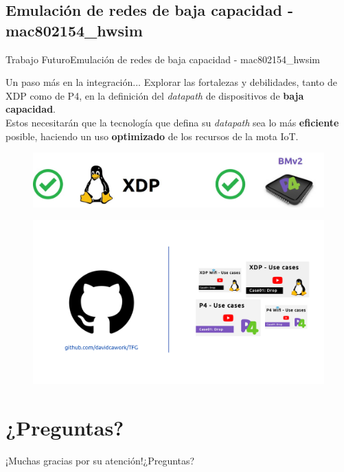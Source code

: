 \documentclass[10pt,compress,xcolor=table]{beamer} %
\begin{document}
\subsection{Emulación de redes de baja capacidad - mac802154\_hwsim}
\begin{frame}{Trabajo Futuro}{Emulación de redes de baja capacidad - mac802154\_hwsim}
\begin{block}{Un paso  más en la integración...}
 Explorar las fortalezas y debilidades, tanto de XDP como de P4, en la definición del \textit{datapath} de dispositivos de \textbf{baja capacidad}. \\
 \vspace{0.2cm}
 Estos necesitarán que la tecnología que defina su \textit{datapath} sea lo más \alert{\textbf{eficiente}} posible, haciendo un uso \alert{\textbf{optimizado}} de los recursos de la mota IoT.
\end{block}

\begin{figure}
  \includegraphics[width=\textwidth]{img/1_test.jpg}
  \label{fig:future}
\end{figure}
\end{frame}

{
    \begin{frame}{}
       \begin{figure}
              \includegraphics[width=\textwidth]{img/init.png}
        \end{figure}
    \end{frame}
}


\section{¿Preguntas?}
{
\sectionheaderWhite 

\begin{frame}{¡Muchas gracias por su atención!}{¿Preguntas?}
\end{frame}

}
\end{document}
